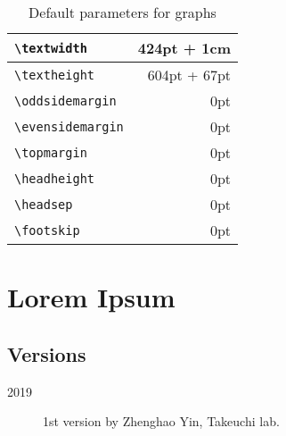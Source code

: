 \documentclass{kuee_en}
\begin{document}
\begin{table}
  \caption{Default parameters for graphs}\label{tab:fig}
  \begin{center}
    \begin{tabular}{|l|r|}
      \hline
      \verb+\textwidth+ & 424pt + 1cm \\ \hline
      \verb+\textheight+ & 604pt + 67pt \\ \hline
      \verb+\oddsidemargin+ & 0pt \\ \hline
      \verb+\evensidemargin+ & 0pt \\ \hline
      \verb+\topmargin+ & 0pt \\ \hline
      \verb+\headheight+ & 0pt \\ \hline
      \verb+\headsep+ & 0pt \\ \hline
      \verb+\footskip+ & 0pt \\ \hline
    \end{tabular}
  \end{center}
\end{table}


\chapter{Lorem Ipsum}
\lipsum[1-10]


\begin{acknowledgements}
\lipsum[2]
\end{acknowledgements}

\printbibliography[title=References,heading=bibintoc]

\clearpage %
\processdelayedfloats
\clearpage

\begin{appendices}
\chapter{Versions}
\begin{description}
  \item[2019] 1st version by Zhenghao Yin, Takeuchi lab.
\end{description}
\end{appendices}
\end{document}
